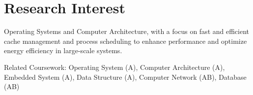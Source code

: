 \section{Research Interest}
\begin{onecolentry}
    Operating Systems and Computer Architecture,
    with a focus on fast and efficient cache management and process scheduling
    to enhance performance and optimize energy efficiency in large-scale systems.
    \begin{highlights}
        \item  Related Coursework:
            Operating System (A),
            Computer Architecture (A),
            Embedded System (A),
            Data Structure (A),
            Computer Network (AB),
            Database (AB)
    \end{highlights}
\end{onecolentry}
